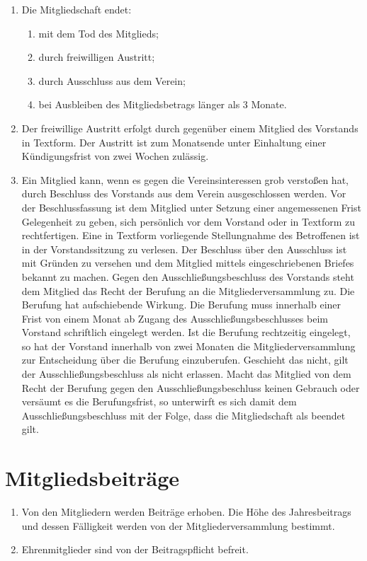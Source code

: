 \begin{enumerate}
	\item Die Mitgliedschaft endet:
		\begin{enumerate}[1)]
			\item mit dem Tod des Mitglieds;
			\item durch freiwilligen Austritt;
			\item durch Ausschluss aus dem Verein;
			\item bei Ausbleiben des Mitgliedsbetrags länger als 3 Monate.
		\end{enumerate}

	\item Der freiwillige Austritt erfolgt durch gegenüber einem Mitglied des Vorstands in Textform. Der Austritt ist zum Monatsende unter Einhaltung einer Kündigungsfrist von zwei Wochen zulässig.
	\item Ein Mitglied kann, wenn es gegen die Vereinsinteressen grob verstoßen hat, durch Beschluss des Vorstands aus dem Verein ausgeschlossen werden. Vor der Beschlussfassung ist dem Mitglied unter Setzung einer angemessenen Frist Gelegenheit zu geben, sich persönlich vor dem Vorstand oder in Textform zu rechtfertigen. Eine in Textform vorliegende Stellungnahme des Betroffenen ist in der Vorstandssitzung zu verlesen. Der Beschluss über den Ausschluss ist mit
		Gründen zu versehen und dem Mitglied mittels eingeschriebenen Briefes bekannt zu machen. Gegen den Ausschließungsbeschluss des Vorstands steht dem Mitglied das Recht der Berufung an die Mitgliederversammlung zu. Die Berufung hat aufschiebende Wirkung. Die Berufung muss innerhalb einer Frist von einem Monat ab Zugang des Ausschließungsbeschlusses beim Vorstand schriftlich eingelegt werden. Ist die Berufung rechtzeitig eingelegt, so hat
		der Vorstand innerhalb von zwei Monaten die Mitgliederversammlung zur Entscheidung über die Berufung einzuberufen. Geschieht das nicht, gilt der Ausschließungsbeschluss als nicht erlassen. Macht das Mitglied von dem Recht der Berufung gegen den Ausschließungsbeschluss keinen Gebrauch oder versäumt es die Berufungsfrist, so unterwirft es sich damit dem Ausschließungsbeschluss mit der Folge, dass die Mitgliedschaft als beendet gilt.
\end{enumerate}

\chapter{Mitgliedsbeiträge}
\begin{enumerate}
	\item Von den Mitgliedern werden Beiträge erhoben. Die Höhe des Jahresbeitrags und dessen Fälligkeit werden von der Mitgliederversammlung bestimmt.
	\item Ehrenmitglieder sind von der Beitragspflicht befreit.
\end{enumerate}

